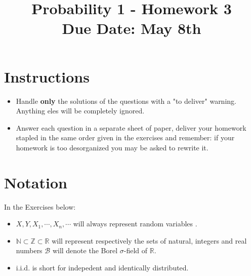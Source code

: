 \documentclass[a4paper,10pt]{article}
\title{Probability 1 - Homework 3 \\ Due Date: May 8th}
\author{}
\date{}
\newcommand{\N}{\mathbb{N}}
\newcommand{\Z}{\mathbb{Z}}
\newcommand{\R}{\mathbb{R}}
\newcommand{\B}{\mathcal{B}}
\begin{document}
\maketitle

\section*{Instructions}

\begin{itemize}
 \item Handle \textbf{only} the solutions of the questions with a "to deliver" warning. Anything eles will be completely
 ignored.
 
 \item Answer each question in a separate sheet of paper, deliver your homework stapled in the same order given in the exercises and 
remember: if your homework is too desorganized you may be asked to rewrite it.
\end{itemize}

\section*{Notation}

In the Exercises below:

\begin{itemize}
 \item $X,Y,X_1,\cdots, X_n, \cdots$ will always represent random variables  .
 
  \item $\N \subset \Z \subset \R$ will represent respectively the sets of natural, integers and real numbers $\B$ 
 will denote the Borel $\sigma$-field of $\R$.
 
 \item  i.i.d. is short for indepedent and identically distributed.
\end{itemize}
\end{document}

